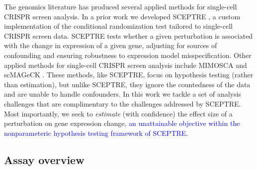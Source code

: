 \documentclass[12pt]{article}
\newcommand{\blue}[1]{\textcolor{blue}{#1}}
\begin{document}
The genomics literature has produced several applied methods for single-cell CRISPR screen analysis. In a prior work we developed SCEPTRE \cite{Barry2020}, a custom implementation of the conditional randomization test \cite{Candes2018, Liu2021} tailored to single-cell CRISPR screen data. SCEPTRE tests whether a given perturbation is associated with the change in expression of a given gene, adjusting for sources of confounding and ensuring robustness to expression model misspecification. Other applied methods for single-cell CRISPR screen analysis include MIMOSCA \cite{Dixit2016} and scMAGeCK \cite{Yang2019}. These methods, like SCEPTRE, focus on hypothesis testing (rather than estimation), but unlike SCEPTRE, they ignore the countedness of the data and are unable to handle confounders. In this work we tackle a set of analysis challenges that are complimentary to the challenges addressed by SCEPTRE. Most importantly, we seek to \textit{estimate} (with confidence) the effect size of a perturbation on gene expression change, \blue{an unattainable objective within the nonparameteric hypothesis testing framework of SCEPTRE.}

\subsection{Assay overview}
\end{document}
